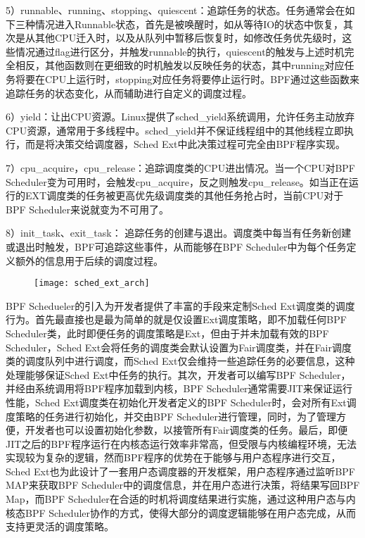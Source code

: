 5）runnable、running、stopping、quiescent：追踪任务的状态。任务通常会在如下三种情况进入Runnable状态，首先是被唤醒时，如从等待IO的状态中恢复，其次是从其他CPU迁入时，以及从队列中暂移后恢复时，如修改任务优先级时，这些情况通过flag进行区分，并触发runnable的执行，quiescent的触发与上述时机完全相反，其他函数则在更细致的时机触发以反映任务的状态，其中running对应任务将要在CPU上运行时，stopping对应任务将要停止运行时。BPF通过这些函数来追踪任务的状态变化，从而辅助进行自定义的调度过程。

6）yield：让出CPU资源。Linux提供了sched\_yield系统调用，允许任务主动放弃CPU资源，通常用于多线程中。sched\_yield并不保证线程组中的其他线程立即执行，而是将决策交给调度器，Sched Ext中此决策过程可完全由BPF程序实现。

7）cpu\_acquire，cpu\_release：追踪调度类的CPU进出情况。当一个CPU对BPF Scheduler变为可用时，会触发cpu\_acquire，反之则触发cpu\_release。如当正在运行的EXT调度类的任务被更高优先级调度类的其他任务抢占时，当前CPU对于BPF Scheduler来说就变为不可用了。

8）init\_task、exit\_task： 追踪任务的创建与退出。调度类中每当有任务新创建或退出时触发，BPF可追踪这些事件，从而能够在BPF Scheduler中为每个任务定义额外的信息用于后续的调度过程。

\begin{figure}[!htbp]
    \centering
    \texttt{[image: sched\_ext\_arch]}
    \label{fig:sched_ext_arch}
\end{figure}

BPF Schedueler的引入为开发者提供了丰富的手段来定制Sched Ext调度类的调度行为。首先最直接也是最为简单的就是仅设置Ext调度策略，即不加载任何BPF Scheduler类，此时即便任务的调度策略是Ext，但由于并未加载有效的BPF Scheduler，Sched Ext会将任务的调度类会默认设置为Fair调度类，并在Fair调度类的调度队列中进行调度，而Sched Ext仅会维持一些追踪任务的必要信息，这种处理能够保证Sched Ext中任务的执行。其次，开发者可以编写BPF Scheduler，并经由系统调用将BPF程序加载到内核，BPF Scheduler通常需要JIT来保证运行性能，Sched Ext调度类在初始化开发者定义的BPF Scheduler时，会对所有Ext调度策略的任务进行初始化，并交由BPF Scheduler进行管理，同时，为了管理方便，开发者也可以设置初始化参数，以接管所有Fair调度类的任务。最后，即便JIT之后的BPF程序运行在内核态运行效率非常高，但受限与内核编程环境，无法实现较为复杂的逻辑，然而BPF程序的优势在于能够与用户态程序进行交互，Sched Ext也为此设计了一套用户态调度器的开发框架，用户态程序通过监听BPF MAP来获取BPF Scheduler中的调度信息，并在用户态进行决策，将结果写回BPF Map，而BPF Scheduler在合适的时机将调度结果进行实施，通过这种用户态与内核态BPF Scheduler协作的方式，使得大部分的调度逻辑能够在用户态完成，从而支持更灵活的调度策略。

